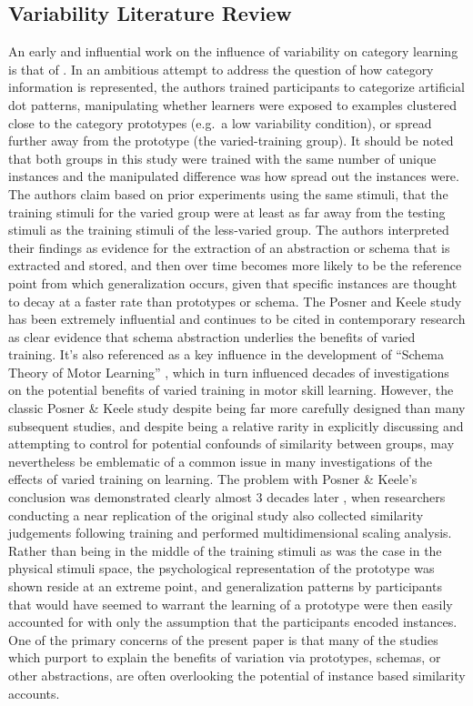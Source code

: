 \documentclass[
  12pt,
  letterpaper,
]{article}
\begin{document}
\subsection{Variability Literature
Review}\label{variability-literature-review}

An early and influential work on the influence of variability on
category learning is that of \textcite{posnerGenesisAbstractIdeas1968}.
In an ambitious attempt to address the question of how category
information is represented, the authors trained participants to
categorize artificial dot patterns, manipulating whether learners were
exposed to examples clustered close to the category prototypes (e.g.~a
low variability condition), or spread further away from the prototype
(the varied-training group). It should be noted that both groups in this
study were trained with the same number of unique instances and the
manipulated difference was how spread out the instances were. The
authors claim based on prior experiments using the same stimuli, that
the training stimuli for the varied group were at least as far away from
the testing stimuli as the training stimuli of the less-varied group.
The authors interpreted their findings as evidence for the extraction of
an abstraction or schema that is extracted and stored, and then over
time becomes more likely to be the reference point from which
generalization occurs, given that specific instances are thought to
decay at a faster rate than prototypes or schema. The Posner and Keele
study has been extremely influential and continues to be cited in
contemporary research as clear evidence that schema abstraction
underlies the benefits of varied training. It's also referenced as a key
influence in the development of ``Schema Theory of Motor Learning''
\autocite{schmidtSchemaTheoryDiscrete1975}, which in turn influenced
decades of investigations on the potential benefits of varied training
in motor skill learning. However, the classic Posner \& Keele study
despite being far more carefully designed than many subsequent studies,
and despite being a relative rarity in explicitly discussing and
attempting to control for potential confounds of similarity between
groups, may nevertheless be emblematic of a common issue in many
investigations of the effects of varied training on learning. The
problem with Posner \& Keele's conclusion was demonstrated clearly
almost 3 decades later \autocite{palmeriCentralTendenciesExtreme2001},
when researchers conducting a near replication of the original study
also collected similarity judgements following training and performed
multidimensional scaling analysis. Rather than being in the middle of
the training stimuli as was the case in the physical stimuli space, the
psychological representation of the prototype was shown reside at an
extreme point, and generalization patterns by participants that would
have seemed to warrant the learning of a prototype were then easily
accounted for with only the assumption that the participants encoded
instances. One of the primary concerns of the present paper is that many
of the studies which purport to explain the benefits of variation via
prototypes, schemas, or other abstractions, are often overlooking the
potential of instance based similarity accounts.
\end{document}
